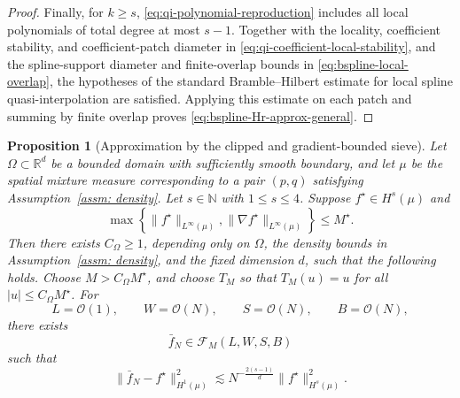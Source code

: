 \documentclass[11pt]{article}
\theoremstyle{plain}
\newtheorem{proposition}[theorem]{Proposition}
\theoremstyle{definition}
\theoremstyle{remark}
\begin{document}
\begin{proof}
Finally, for \(k\ge s\), \eqref{eq:qi-polynomial-reproduction} includes all
local polynomials of total degree at most \(s-1\). Together with the locality,
coefficient stability, and coefficient-patch diameter in
\eqref{eq:qi-coefficient-local-stability}, and the spline-support diameter
and finite-overlap bounds in \eqref{eq:bspline-local-overlap}, the hypotheses
of the standard Bramble--Hilbert estimate for local spline
quasi-interpolation are satisfied. Applying this estimate on each patch and
summing by finite overlap \cite{schumaker2007spline} proves
\eqref{eq:bspline-Hr-approx-general}.
\end{proof}

\begin{proposition}[Approximation by the clipped and gradient-bounded sieve]
\label{prop: approximate of clipped NN}
Let \(\Omega\subset\mathbb R^d\) be a bounded domain with sufficiently smooth
boundary, and let \(\mu\) be the spatial mixture measure corresponding to a pair
\((p,q)\) satisfying Assumption~\ref{assm: density}. Let \(s\in\mathbb N\)
with \(1\le s\le4\). Suppose
$
f^\star\in H^s(\mu)
$
and
\[
\max\left\{
\|f^\star\|_{L^\infty(\mu)},
\|\nabla f^\star\|_{L^\infty(\mu)}
\right\}
\le M^\star .
\]
Then there exists \(C_\Omega\ge1\), depending only on \(\Omega\), the density
bounds in Assumption~\ref{assm: density}, and the fixed dimension \(d\), such
that the following holds. Choose \(M>C_\Omega M^\star\), and choose \(T_M\)
so that \(T_M(u)=u\) for all \(|u|\le C_\Omega M^\star\). For
\[
L=\mathcal O(1),
\qquad
W=\mathcal O(N),
\qquad
S=\mathcal O(N),
\qquad
B=\mathcal O(N),
\]
there exists
\[
\bar f_N\in\mathcal F_M(L,W,S,B)
\]
such that
\begin{equation}
\label{eq:clipped-approx-H1-final}
\|\bar f_N-f^\star\|_{H^1(\mu)}^2
\lesssim
N^{-\frac{2(s-1)}{d}}
\|f^\star\|_{H^s(\mu)}^2 .
\end{equation}
\end{proposition}
\end{document}
